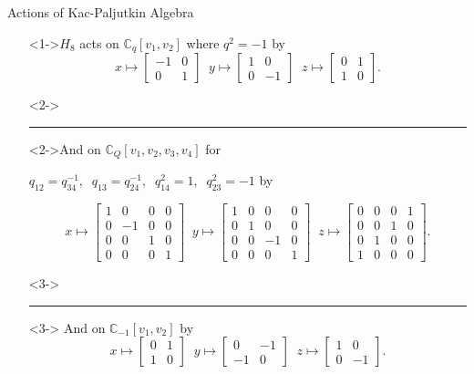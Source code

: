 \documentclass{beamer}
\begin{document}
\begin{frame}{Actions of Kac-Paljutkin Algebra}

\begin{itemize}
    \item[]<1->$H_8$ acts on $\mathbb{C}_q[v_1,v_2]$ where $q^2=-1$ by 
    \[
    x\mapsto \begin{bmatrix}-1 & 0\\0 & 1\end{bmatrix} \;\; y\mapsto \begin{bmatrix} 1 & 0\\ 0 & -1\end{bmatrix} \;\; z\mapsto\begin{bmatrix} 0 & 1\\ 1 & 0\end{bmatrix}.
    \]
    \item[]<2-> \hrule
    \item[]<2->And on $\mathbb{C}_Q[v_1,v_2,v_3,v_4]$ for 
   
    \vspace{1ex}
    $q_{12}=q_{34}^{-1},\;\;q_{13}=q_{24}^{-1},\;\;q_{14}^2=1,\;\;q_{23}^2=-1$ by
    
    \[
    x\mapsto \begin{bmatrix} 1&0&0&0\\0&-1&0&0\\0&0&1&0\\0&0&0&1\end{bmatrix} \;\; y\mapsto \begin{bmatrix} 1&0&0&0\\0&1&0&0\\0&0&-1&0\\0&0&0&1\end{bmatrix}\;\; z\mapsto\begin{bmatrix}0&0&0&1\\0&0&1&0\\0&1&0&0\\1&0&0&0\end{bmatrix}.
    \]
    
    \item[]<3->\hrule
    \item[]<3-> And on $\mathbb{C}_{-1}[v_1,v_2]$ by 
    \[
    x\mapsto \begin{bmatrix}0&1\\1&0\end{bmatrix}\;\; y\mapsto\begin{bmatrix}0&-1\\-1&0\end{bmatrix}\;\; z\mapsto\begin{bmatrix}1&0\\0&-1\end{bmatrix}.
    \]
\end{itemize}
\end{frame}
\end{document}
